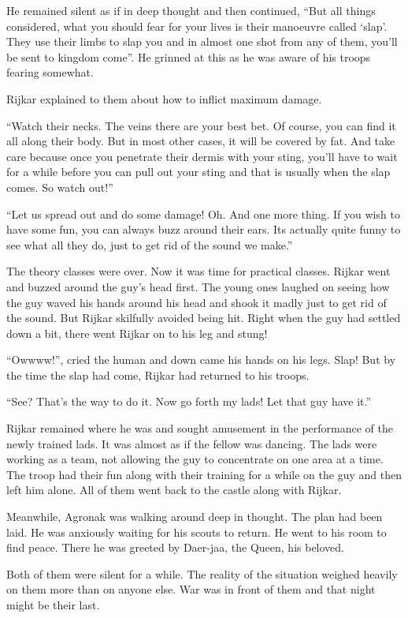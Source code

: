\documentclass[twoside,11pt,titlepage]{article}
\begin{document}
He remained silent as if in deep thought and then continued, ``But all things considered, what you should fear for your lives is their manoeuvre called `slap'. They use their limbs to slap you and in almost one shot from any of them, you'll be sent to kingdom come''. He grinned at this as he was aware of his troops fearing somewhat.

Rijkar explained to them about how to inflict maximum damage.

``Watch their necks. The veins there are your best bet. Of course, you can find it all along their body. But in most other cases, it will be covered by fat. And take care because once you penetrate their dermis with your sting, you'll have to wait for a while before you can pull out your sting and that is usually when the slap comes. So watch out!''

``Let us spread out and do some damage! Oh. And one more thing. If you wish to have some fun, you can always buzz around their ears. Its actually quite funny to see what all they do, just to get rid of the sound we make.''

The theory classes were over. Now it was time for practical classes. Rijkar went and buzzed around the guy's head first. The young ones laughed on seeing how the guy waved his hands around his head and shook it madly just to get rid of the sound. But Rijkar skilfully avoided being hit. Right when the guy had settled down a bit, there went Rijkar on to his leg and stung!

``Owwww!'', cried the human and down came his hands on his legs. Slap! But by the time the slap had come, Rijkar had returned to his troops.

``See? That's the way to do it. Now go forth my lads! Let that guy have it.''

Rijkar remained where he was and sought amusement in the performance of the newly trained lads. It was almost as if the fellow was dancing. The lads were working as a team, not allowing the guy to concentrate on one area at a time. The troop had their fun along with their training for a while on the guy and then left him alone. All of them went back to the castle along with Rijkar.

Meanwhile, Agronak was walking around deep in thought. The plan had been laid. He was anxiously waiting for his scouts to return. He went to his room to find peace. There he was greeted by Daer-jaa, the Queen, his beloved.

Both of them were silent for a while. The reality of the situation weighed heavily on them more than on anyone else. War was in front of them and that night might be their last.
\end{document}
